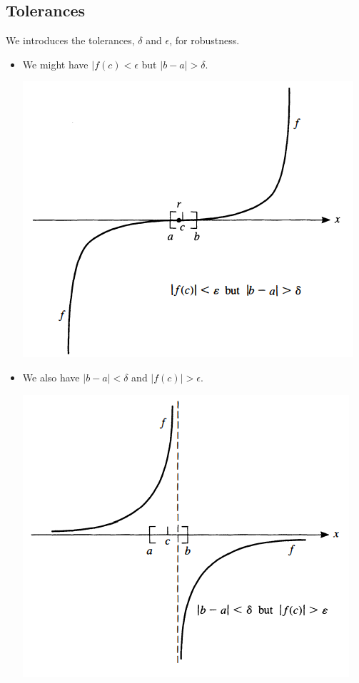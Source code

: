 \documentclass[letterpaper]{article}
\begin{document}
\subsection{Tolerances}
We introduces the tolerances, $\delta$ and $\epsilon$, for robustness. 
\begin{itemize}
    \item We might have $|f(c) < \epsilon$ but $|b - a| > \delta$. 
    \begin{center}
        \includegraphics[scale=0.8]{../assets/case1.png}
    \end{center}
    \item We also have $|b - a| < \delta$ and $|f(c)| > \epsilon$.
    \begin{center}
        \includegraphics[scale=0.8]{../assets/case2.png}
    \end{center}
\end{itemize}
\end{document}
